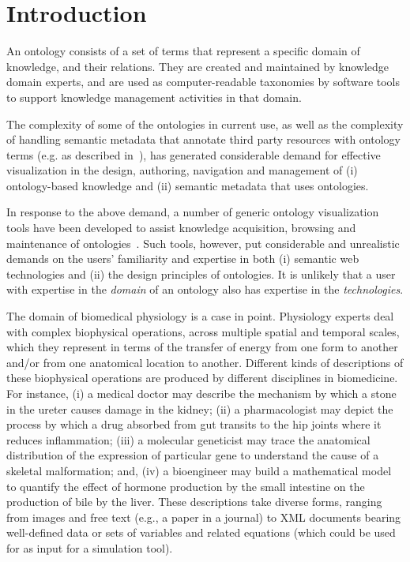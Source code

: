 \section{Introduction}                                                                   %

An ontology consists of a set of terms that represent a specific domain of knowledge, and their relations. They are created and maintained by knowledge domain experts, and are used as computer-readable taxonomies by software tools to support knowledge management activities in that domain.

The complexity of some of the ontologies in current use, as well as the complexity of handling semantic metadata that annotate third party resources with ontology terms (e.g. as described in~\cite{BHW+11}), has generated considerable demand for effective visualization in the design, authoring, navigation and management of (i) ontology-based knowledge and (ii) semantic metadata that uses ontologies.

In response to the above demand, a number of generic ontology visualization tools have been developed to assist knowledge acquisition, browsing and maintenance of ontologies~\cite{KHL+07}. Such tools, however, put considerable and unrealistic demands on the users' familiarity and expertise in both (i) semantic web technologies and (ii) the design principles of ontologies. It is unlikely that a user with expertise in the \emph{domain} of an ontology also has expertise in the \emph{technologies}.

The domain of biomedical physiology is a case in point. Physiology experts deal with complex biophysical operations, across multiple spatial and temporal scales, which they represent in terms of the transfer of energy from one form to another and/or from one anatomical location to another. Different kinds of descriptions of these biophysical operations are produced by different disciplines in biomedicine. For instance, (i) a medical doctor may describe the mechanism by which a stone in the ureter causes damage in the kidney; (ii) a pharmacologist may depict the process by which a drug absorbed from gut transits to the hip joints where it reduces inflammation; (iii) a molecular geneticist may trace the anatomical distribution of the expression of particular gene to understand the cause of a skeletal malformation; and, (iv) a bioengineer may build a mathematical model to quantify the effect of hormone production by the small intestine on the production of bile by the liver. These descriptions take diverse forms, ranging from images and free text (e.g., a paper in a journal) to XML documents bearing well-defined data or sets of variables and related equations (which could be used for as input for a simulation tool).

